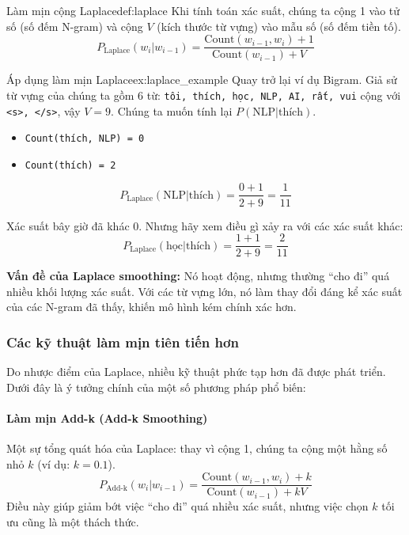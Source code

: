 \begin{definition}{Làm mịn cộng Laplace}{def:laplace}
    Khi tính toán xác suất, chúng ta cộng 1 vào tử số (số đếm N-gram) và cộng $V$ (kích thước từ vựng) vào mẫu số (số đếm tiền tố).
    $$ P_{\text{Laplace}}(w_i | w_{i-1}) = \frac{\text{Count}(w_{i-1}, w_i) + 1}{\text{Count}(w_{i-1}) + V} $$
\end{definition}

\begin{example}{Áp dụng làm mịn Laplace}{ex:laplace_example}
    Quay trở lại ví dụ Bigram. Giả sử từ vựng của chúng ta gồm 6 từ: \texttt{tôi, thích, học, NLP, AI, rất, vui} cộng với \texttt{<s>, </s>}, vậy $V=9$.
    Chúng ta muốn tính lại $P(\text{NLP}|\text{thích})$.
    \begin{itemize}
        \item \texttt{Count(thích, NLP) = 0}
        \item \texttt{Count(thích) = 2}
    \end{itemize}

    $$ P_{\text{Laplace}}(\text{NLP} | \text{thích}) = \frac{0 + 1}{2 + 9} = \frac{1}{11} $$

    Xác suất bây giờ đã khác 0. Nhưng hãy xem điều gì xảy ra với các xác suất khác:
    $$ P_{\text{Laplace}}(\text{học} | \text{thích}) = \frac{1 + 1}{2 + 9} = \frac{2}{11} $$

    \textbf{Vấn đề của Laplace smoothing:} Nó hoạt động, nhưng thường “cho đi” quá nhiều khối lượng xác suất. Với các từ vựng lớn, nó làm thay đổi đáng kể xác suất của các N-gram đã thấy, khiến mô hình kém chính xác hơn.
\end{example}

\subsubsection{Các kỹ thuật làm mịn tiên tiến hơn}
Do nhược điểm của Laplace, nhiều kỹ thuật phức tạp hơn đã được phát triển. Dưới đây là ý tưởng chính của một số phương pháp phổ biến:

\paragraph{Làm mịn Add-k (Add-k Smoothing)}
Một sự tổng quát hóa của Laplace: thay vì cộng 1, chúng ta cộng một hằng số nhỏ $k$ (ví dụ: $k=0.1$).
$$ P_{\text{Add-k}}(w_i | w_{i-1}) = \frac{\text{Count}(w_{i-1}, w_i) + k}{\text{Count}(w_{i-1}) + kV} $$
Điều này giúp giảm bớt việc “cho đi” quá nhiều xác suất, nhưng việc chọn $k$ tối ưu cũng là một thách thức.

